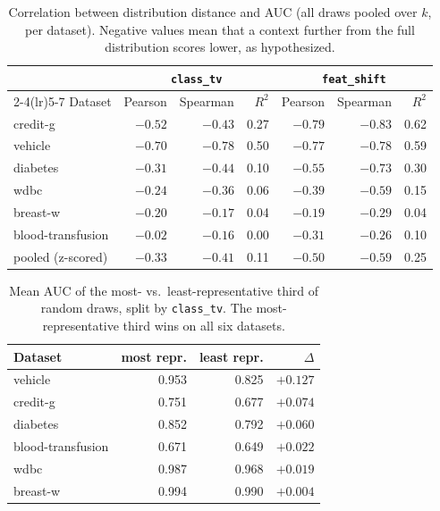\documentclass[11pt,a4paper]{article}
\begin{document}
\begin{table}[h]
\centering
\caption{Correlation between distribution distance and AUC (all draws pooled
over $k$, per dataset). Negative values mean that a context further from the
full distribution scores lower, as hypothesized.}
\label{tab:repr}
\begin{tabular}{lrrrrrr}
\toprule
& \multicolumn{3}{c}{\texttt{class\_tv}} & \multicolumn{3}{c}{\texttt{feat\_shift}} \\
\cmidrule(lr){2-4}\cmidrule(lr){5-7}
Dataset & Pearson & Spearman & $R^2$ & Pearson & Spearman & $R^2$ \\
\midrule
credit-g          & $-0.52$ & $-0.43$ & 0.27 & $-0.79$ & $-0.83$ & 0.62 \\
vehicle           & $-0.70$ & $-0.78$ & 0.50 & $-0.77$ & $-0.78$ & 0.59 \\
diabetes          & $-0.31$ & $-0.44$ & 0.10 & $-0.55$ & $-0.73$ & 0.30 \\
wdbc              & $-0.24$ & $-0.36$ & 0.06 & $-0.39$ & $-0.59$ & 0.15 \\
breast-w          & $-0.20$ & $-0.17$ & 0.04 & $-0.19$ & $-0.29$ & 0.04 \\
blood-transfusion & $-0.02$ & $-0.16$ & 0.00 & $-0.31$ & $-0.26$ & 0.10 \\
\midrule
pooled (z-scored) & $-0.33$ & $-0.41$ & 0.11 & $-0.50$ & $-0.59$ & 0.25 \\
\bottomrule
\end{tabular}
\end{table}

\begin{table}[h]
\centering
\caption{Mean AUC of the most- vs.\ least-representative third of random draws,
split by \texttt{class\_tv}. The most-representative third wins on all six
datasets.}
\label{tab:contrast}
\begin{tabular}{lrrr}
\toprule
Dataset & most repr. & least repr. & $\Delta$ \\
\midrule
vehicle           & 0.953 & 0.825 & $+0.127$ \\
credit-g          & 0.751 & 0.677 & $+0.074$ \\
diabetes          & 0.852 & 0.792 & $+0.060$ \\
blood-transfusion & 0.671 & 0.649 & $+0.022$ \\
wdbc              & 0.987 & 0.968 & $+0.019$ \\
breast-w          & 0.994 & 0.990 & $+0.004$ \\
\bottomrule
\end{tabular}
\end{table}
\end{document}
